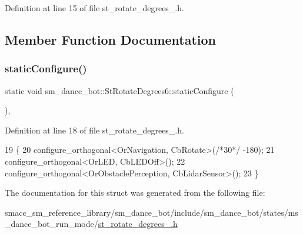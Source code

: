 Definition at line 15 of file st\+\_\+rotate\+\_\+degrees\+\_.\+h.



\subsection{Member Function Documentation}
\mbox{\label{structsm__dance__bot_1_1StRotateDegrees6_a5f6ee6518c741f6ecbb4e18957b63893}} 
\subsubsection{\texorpdfstring{static\+Configure()}{staticConfigure()}}
{\footnotesize\ttfamily static void sm\+\_\+dance\+\_\+bot\+::\+St\+Rotate\+Degrees6\+::static\+Configure (\begin{DoxyParamCaption}{ }\end{DoxyParamCaption})\hspace{0.3cm}{\ttfamily [inline]}, {\ttfamily [static]}}



Definition at line 18 of file st\+\_\+rotate\+\_\+degrees\+\_.\+h.


\begin{DoxyCode}
19   \{
20     configure\_orthogonal<OrNavigation, CbRotate>(\textcolor{comment}{/*30*/} -180);
21     configure\_orthogonal<OrLED, CbLEDOff>();
22     configure\_orthogonal<OrObstaclePerception, CbLidarSensor>();
23   \}
\end{DoxyCode}


The documentation for this struct was generated from the following file\+:\begin{DoxyCompactItemize}
\item 
smacc\+\_\+sm\+\_\+reference\+\_\+library/sm\+\_\+dance\+\_\+bot/include/sm\+\_\+dance\+\_\+bot/states/ms\+\_\+dance\+\_\+bot\+\_\+run\+\_\+mode/\hyperlink{st__rotate__degrees__6_8h}{st\+\_\+rotate\+\_\+degrees\+\_.\+h}\end{DoxyCompactItemize}
